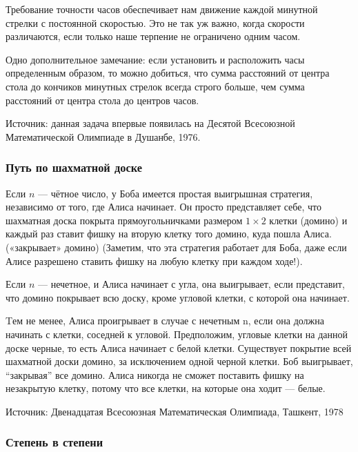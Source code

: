 Требование точности часов обеспечивает нам движение каждой  минутной стрелки с постоянной скоростью. Это не так уж важно, когда  скорости  различаются, если только наше терпение не ограничено одним часом.


Одно дополнительное замечание: если установить и расположить часы определенным образом,
то можно добиться, что сумма расстояний от центра стола до кончиков  минутных стрелок  всегда строго больше, чем сумма расстояний от центра стола до центров часов.\heart


Источник: данная задача впервые появилась на Десятой Всесоюзной Математической Олимпиаде в Душанбе, 1976.




\subsubsection*{Путь по шахматной доске}    %



Если $n$ --- чётное число, у Боба имеется простая выигрышная стратегия, независимо от того, где Алиса начинает.  Он просто представляет себе, что шахматная доска покрыта прямоугольничками размером $1\times2$ клетки (домино) и каждый раз ставит фишку на вторую клетку того домино, куда пошла Алиса. («закрывает» домино) 
(Заметим, что эта стратегия работает для Боба, даже если Алисе разрешено ставить фишку на любую клетку при каждом ходе!).


Если $n$ --- нечетное, и Алиса начинает с угла, она выигрывает,  если представит, что домино покрывает всю доску, кроме угловой клетки, с которой она начинает.


Tем не менее, Алиса проигрывает в случае с нечетным n, если она должна начинать с клетки, соседней к угловой.  Предположим, угловые клетки на данной доске черные, то есть Алиса начинает  с белой клетки. Существует покрытие всей шахматной доски домино, за исключением одной черной клетки. Боб выигрывает, “закрывая” все домино. Алиса
никогда не сможет поставить фишку на незакрытую клетку, потому что все клетки, на которые она ходит ---  белые.\heart


Источник: Двенадцатая Всесоюзная Математическая Олимпиада, Ташкент, 1978




\subsubsection*{Степень в степени} %




